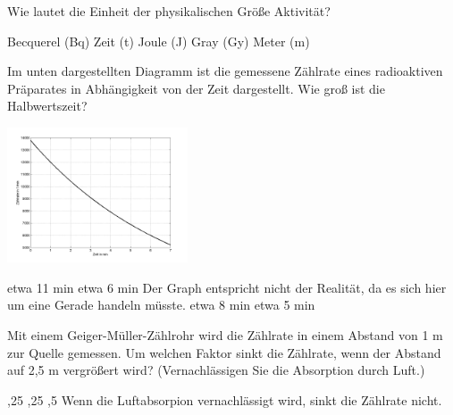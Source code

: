 \documentclass[11pt]{exam}
\begin{document}
\setlength{\voffset}{-0.5in}
\setlength{\headsep}{5pt}

\hspace{2mm}
 \hspace{5mm}
\vspace{4mm}

\begin{questions}

\question Wie lautet die Einheit der physikalischen Größe Aktivität?

\begin{choices}
	\choice Becquerel (Bq)
	\choice Zeit (t)
	\choice Joule (J)
	\choice Gray (Gy)
	\choice Meter (m)
\end{choices}

\vspace{3mm}\question Im unten dargestellten Diagramm ist die gemessene Zählrate eines radioaktiven Präparates in Abhängigkeit von der Zeit dargestellt. Wie groß ist die Halbwertszeit?

\includegraphics[width=0.4\textwidth]{images/zerfall1.png}

\begin{choices}
	\choice etwa 11 min
	\choice etwa 6 min
	\choice Der Graph entspricht nicht der Realität, da es sich hier um eine Gerade handeln müsste.
	\choice etwa 8 min
	\choice etwa 5 min
\end{choices}

\vspace{3mm}\question Mit einem Geiger-Müller-Zählrohr wird die Zählrate in einem Abstand von 1 m zur Quelle gemessen. Um welchen Faktor sinkt die Zählrate, wenn der Abstand auf 2,5 m vergrößert wird? (Vernachlässigen Sie die Absorption durch Luft.)

\begin{choices}
	,25
	,25
	,5
	\choice Wenn die Luftabsorpion vernachlässigt wird, sinkt die Zählrate nicht.
\end{choices}


\end{questions}
\end{document}
